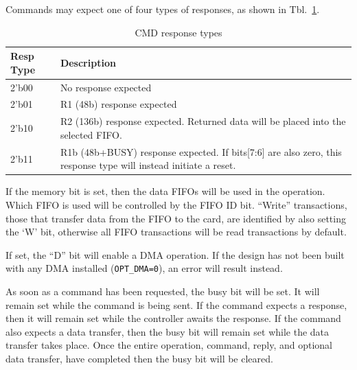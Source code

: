 \documentclass{gqtekspec}
\begin{document}
Commands may expect one of four types of responses, as shown in
Tbl.~\ref{tbl:CMD-TYPE}.
\begin{table}\begin{center}
\begin{tabular}{|p{1.2in}|p{4.0in}|}\hline
	\rowcolor[gray]{0.85} Resp Type & Description\\\hline\hline
2'b00 & No response expected \\
2'b01 & R1 (48b) response expected\\
2'b10 & R2 (136b) response expected.  Returned data will be placed into
	the selected FIFO.\\
2'b11 & R1b (48b+BUSY) response expected.  If bits[7:6] are also zero,
	this response type will instead initiate a reset.
	\\\hline
\end{tabular}
\caption{CMD response types}\label{tbl:CMD-TYPE}
\end{center}\end{table}

If the memory bit is set, then the data FIFOs will be used in the operation.
Which FIFO is used will be controlled by the FIFO ID bit.  ``Write''
transactions, those that transfer data from the FIFO to the card, are
identified by also setting the `W' bit, otherwise all FIFO transactions
will be read transactions by default.

If set, the ``D'' bit will enable a DMA operation.  If the design has not been
built with any DMA installed ({\tt OPT\_DMA=0}), an error will result instead.

As soon as a command has been requested, the busy bit will be set.  It will
remain set while the command is being sent.  If the command expects a response,
then it will remain set while the controller awaits the response.  If the
command also expects a data transfer, then the busy bit will remain set while
the data transfer takes place.  Once the entire operation, command, reply,
and optional data transfer, have completed then the busy bit will be cleared.
\end{document}
